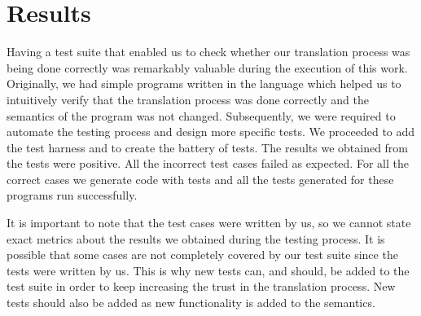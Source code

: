 \section{Results}\label{section:results}

Having a test suite that enabled us to check whether our translation process was being done correctly was remarkably valuable during the execution of this work.
Originally, we had simple programs written in the language which helped us to intuitively verify that the translation process was done correctly and the semantics of the program was not changed.
Subsequently, we were required to automate the testing process and design more specific tests.
We proceeded to add the test harness and to create the battery of tests.
The results we obtained from the tests were positive.
All the incorrect test cases failed as expected.
For all the correct cases we generate code with tests and all the tests generated for these programs run successfully.

It is important to note that the test cases were written by us, so we cannot state exact metrics about the results we obtained during the testing process.
It is possible that some cases are not completely covered by our test suite since the tests were written by us.
This is why new tests can, and should, be added to the test suite in order to keep increasing the trust in the translation process.
New tests should also be added as new functionality is added to the semantics.